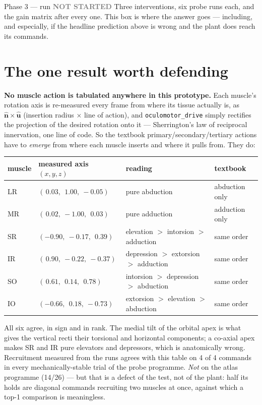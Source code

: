 \documentclass[11pt,a4paper]{article}
\newcommand{\code}[1]{\texttt{#1}}
\newcommand{\todo}{\textcolor{grey}{\textbf{NOT STARTED}}}
\begin{document}
\begin{runbox}{Phase 3 --- run \hfill \todo}
Three interventions, six probe runs each, and the gain matrix after every one. This box is where
the answer goes --- including, and especially, if the headline prediction above is wrong and the
plant does reach its commands.
\end{runbox}

\section{The one result worth defending}

\textbf{No muscle action is tabulated anywhere in this prototype.} Each muscle's rotation axis is
re-measured every frame from where its tissue actually is, as $\hat{\mathbf n}\times\hat{\mathbf u}$
(insertion radius $\times$ line of action), and \code{oculomotor\_drive} simply rectifies the
projection of the desired rotation onto it --- Sherrington's law of reciprocal innervation, one line
of code. So the textbook primary/secondary/tertiary actions have to \emph{emerge} from where each
muscle inserts and where it pulls from. They do:

\begin{center}\small
\begin{tabular}{@{}llll@{}}
\toprule
\textbf{muscle} & \textbf{measured axis $(x,y,z)$} & \textbf{reading} & \textbf{textbook} \\
\midrule
LR & $(\,0.03,\ \ 1.00,\ -0.05)$ & pure abduction & abduction only \\
MR & $(\,0.02,\ -1.00,\ \ 0.03)$ & pure adduction & adduction only \\
SR & $(-0.90,\ -0.17,\ \ 0.39)$ & elevation $>$ intorsion $>$ adduction & same order \\
IR & $(\,0.90,\ -0.22,\ -0.37)$ & depression $>$ extorsion $>$ adduction & same order \\
SO & $(\,0.61,\ \ 0.14,\ \ 0.78)$ & intorsion $>$ depression $>$ abduction & same order \\
IO & $(-0.66,\ \ 0.18,\ -0.73)$ & extorsion $>$ elevation $>$ abduction & same order \\
\bottomrule
\end{tabular}
\end{center}

All six agree, in sign and in rank. The medial tilt of the orbital apex is what gives the vertical
recti their torsional and horizontal components; a co-axial apex makes SR and IR pure elevators and
depressors, which is anatomically wrong. Recruitment measured from the runs agrees with this table
on 4 of 4 commands in every mechanically-stable trial of the probe programme. \emph{Not} on the
atlas programme (14/26) --- but that is a defect of the test, not of the plant: half its holds are
diagonal commands recruiting two muscles at once, against which a top-1 comparison is meaningless.
\end{document}
